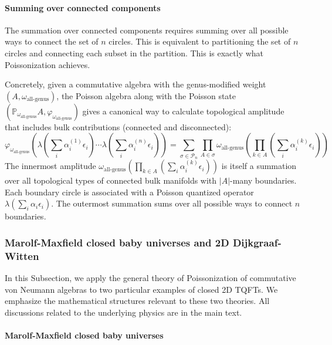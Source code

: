 \documentclass[a4paper,11pt]{article}
\theoremstyle{definition}
\numberwithin{equation}{section}
\begin{document}
\paragraph{Summing over connected components}

The summation over connected components requires summing over all possible ways to connect the set of $n$ circles. This is equivalent to partitioning the set of $n$ circles and connecting each subset in the partition. This is exactly what Poissonization achieves.

Concretely, given a commutative algebra with the genus-modified weight $(A,\omega_\text{all-genus})$, the Poisson algebra along with the Poisson state $(\mathbb{P}_{\omega_\text{all-genus}}A, \varphi_{\omega_\text{all-genus}})$ gives a canonical way to calculate topological amplitude that includes bulk contributions (connected and disconnected):
\begin{equation}
    \varphi_{\omega_\text{all-genus}}(\lambda(\sum_i\alpha_i^{(1)}\epsilon_i)\cdots\lambda(\sum_i\alpha_i^{(n)}\epsilon_i)) = \sum_{\sigma\in\mathcal{P}_n}\prod_{A\in\sigma}\omega_\text{all-genus}(\prod_{k\in A}(\sum_i\alpha_i^{(k)}\epsilon_i))
\end{equation}
The innermost amplitude $\omega_\text{all-genus}(\prod_{k\in A}(\sum_i\alpha_i^{(k)}\epsilon_i))$ is itself a summation over all topological types of connected bulk manifolds with $|A|$-many boundaries. Each boundary circle is associated with a Poisson quantized operator $\lambda(\sum_i\alpha_i\epsilon_i)$. The outermost summation sums over all possible ways to connect $n$ boundaries.

\subsubsection*{Marolf-Maxfield closed baby universes and 2D Dijkgraaf-Witten}\label{subsection:MMDW}

In this Subsection, we apply the general theory of Poissonization of commutative von Neumann algebras to two particular examples of closed 2D TQFTs. We emphasize the mathematical structures relevant to these two theories. All discussions related to the underlying physics are in the main text. 

\paragraph{Marolf-Maxfield closed baby universes}
\end{document}

